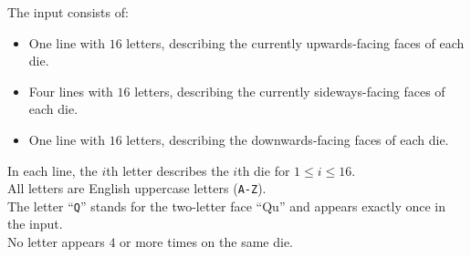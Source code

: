 
    The input consists of:
    \begin{itemize}
        \item One line with $16$ letters, describing the currently upwards-facing faces of each die.
        \item Four lines with $16$ letters, describing the currently sideways-facing faces of each die.
        \item One line with $16$ letters, describing the downwards-facing faces of each die.
    \end{itemize}
    In each line, the $i$th letter describes the $i$th die for $1\leq i\leq 16$. \\
    All letters are English uppercase letters (\texttt{A-Z}). \\
    The letter ``\texttt{Q}'' stands for the two-letter face ``Qu''
    and appears exactly once in the input. \\
    No letter appears $4$ or more times on the same die.
